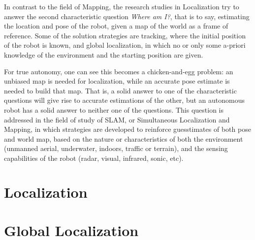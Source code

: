 In contrast to the field of Mapping, the research studies in Localization try to answer the second characteristic question \emph{Where am I?},
that is to say, estimating the location and pose of the robot, given a map of the world as a frame of reference. Some of the solution strategies
are tracking, where the initial position of the robot is known, and global localization, in which no or only some a-priori knowledge of the 
environment and the starting position are given.

For true autonomy, one can see this becomes a chicken-and-egg problem: an unbiased map is needed for localization, while an accurate pose
estimate is needed to build that map. That is, a solid answer to one of the characteristic questions will give rise to accurate estimations
of the other, but an autonomous robot has a solid answer to neither one of the questions. This question is addressed in the field of study of 
SLAM, or Simultaneous Localization and Mapping, in which strategies are developed to reinforce guesstimates of both pose and world map, based on
the nature or characteristics of both the environment (unmanned aerial, underwater, indoors, traffic or terrain), and the sensing capabilities of
the robot (radar, visual, infrared, sonic, etc).

\section{Localization}
\label{sec:robo-local}

\section{Global Localization}
\label{sec:robo-global}
